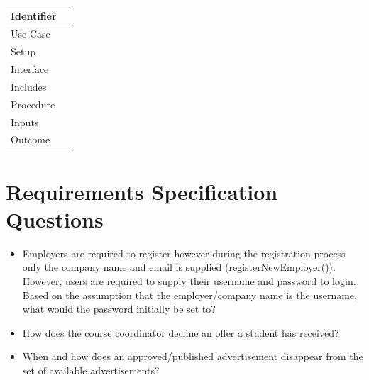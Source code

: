 \documentclass[11pt]{article}
\begin{document}
\begin{tabularx}{\textwidth}{|T|L|}
\hline
Identifier &\\
\hline
Use Case &\\
\hline
Setup &\\
\hline
Interface &\\
\hline
Includes &\\
\hline
Procedure &\\
\hline
Inputs &\\
\hline
Outcome &\\
\hline
\end{tabularx}

\newpage

\section{Requirements Specification Questions}

\begin{itemize}

\item{Employers are required to register however during the registration process
only the company name and email is supplied (registerNewEmployer()). However,
users are required to supply their username and password to login. Based on the
assumption that the employer/company name is the username, what would the
password initially be set to?}

\item{How does the course coordinator decline an offer a student has received?}

\item{When and how does an approved/published advertisement disappear from the 
set of available advertisements?}

\end{itemize}
\end{document}
